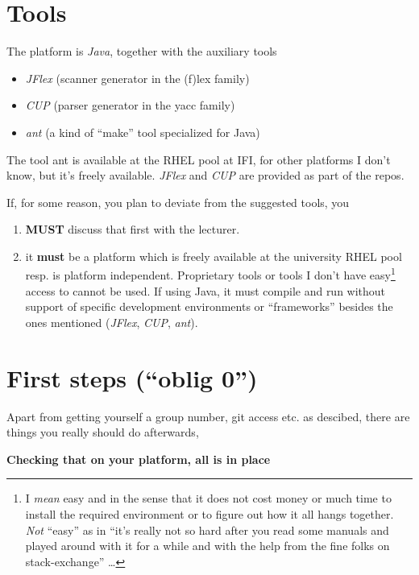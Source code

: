 \documentclass[10pt,freeform]{handout}[2014/08/13]
\begin{document}
\section{Tools}

The platform is \emph{Java}, together with the auxiliary tools

\begin{itemize}
\item \textsl{JFlex} (scanner generator in the (f)lex family)
\item \textsl{CUP} (parser generator in the yacc family)
\item \textsl{ant} (a kind of ``make'' tool specialized for Java)
\end{itemize}


The tool ant is available at the RHEL pool at IFI, for other platforms I
don't know, but it's freely available. \textsl{JFlex} and \textsl{CUP} are
provided as part of the repos.

If, for some reason, you plan to deviate from the suggested tools, you
\begin{enumerate}
\item \textbf{MUST} discuss that first with the lecturer.
\item it \textbf{must} be a platform which is freely available at the
  university RHEL pool resp. is platform independent. Proprietary tools or
  tools I don't have easy\footnote{I \emph{mean} easy and in the sense that
    it does not cost money or much time to install the required environment
    or to figure out how it all hangs together. \emph{Not} ``easy'' as in
    ``it's really not so hard after you read some manuals and played around
    with it for a while and with the help from the fine folks on
    stack-exchange'' \ldots} access to cannot be used. If using Java, it
  must compile and run without support of specific development environments
  or ``frameworks'' besides the ones mentioned (\textsl{JFlex},
  \textsl{CUP}, \textsl{ant}).
\end{enumerate}


\section{First steps (``oblig 0'')}
\label{sec:first-steps-oblig}

Apart from getting yourself a group number, git access etc. as descibed,
there are things you really should do afterwards, 

\begin{center}
  \textbf{Checking that on your platform, all is in place}
\end{center}
\end{document}
